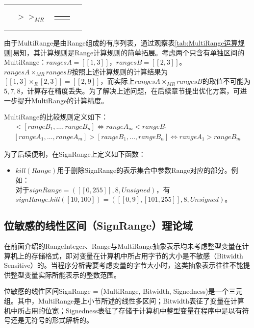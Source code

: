 \begin{longtable}[H]{cclc}
	\begin{tabular}{c}
		shr\\
	\end{tabular} & $ >>_{MR} $ & \begin{tabular}{lc}
		$ rangesA >>_{MR} rangesB :=  [[rangesA \times_{>>_R} rangesB]]_{MR} $
	\end{tabular}\\
	\bottomrule[1.5pt]
\end{longtable}

由于MultiRange是由Range组成的有序列表，通过观察表\ref{tab:MultiRange运算规则}易知，其计算规则是Range计算规则的简单拓展。考虑两个只含有单独区间的MultiRange：$ rangesA = [[1, 3]]$，$ rangesB = [[2, 3]] $。$ rangesA \times_{MR} rangesB $按照上述计算规则的计算结果为$ [[1, 3] \times_R [2, 3]]  = [[2, 9]] $，而实际上$ rangesA \times_{MR} rangesB $的取值不可能为$ 5, 7, 8 $，计算存在精度丢失。为了解决上述问题，在后续章节提出优化方案，可进一步提升MultiRange的计算精度。

MultiRange的比较规则定义如下：
\begin{align}
	[rangeA_1, \dots, rangeA_m] < [rangeB_1, \dots, rangeB_n] \iff rangeA_m < rangeB_1\\
	[rangeA_1, \dots, rangeA_m] > [rangeB_1, \dots, rangeB_n] \iff rangeA_1 > rangeB_m
\end{align}

为了后续便利，在SignRange上定义如下函数：
\begin{itemize}
	\item $ kill(Range)$用于删除SignRange的表示集合中参数Range对应的部分。例如：\\
	对于$ signRange = ([[0, 255]], 8, Unsigned) $，有$ signRange.kill([10, 100]) = ([[0, 9], [101, 255]], 8, Unsigned) $。
\end{itemize}

\subsection{位敏感的线性区间（SignRange）理论域}

在前面介绍的RangeInteger、Range与MultiRange抽象表示均未考虑整型变量在计算机上的存储格式，即对变量在计算机中所占用字节的大小是不敏感（Bitwidth Sensitive）的。当程序分析需要考虑变量的字节大小时，这类抽象表示往往不能提供整型变量实际所能表示的整数范围。

位敏感的线性区间SignRange = (MultiRange, Bitwidth, Signedness)是一个三元组。其中，MultiRange是上小节所述的线性多区间；Bitwidth表征了变量在计算机中所占用的位宽；Signedness表征了存储于计算机中整型变量在程序中是以有符号还是无符号的形式解析的。

